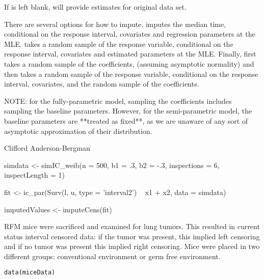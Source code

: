 \documentclass[a4paper]{book}
\begin{document}
%
\begin{Details}\relax
 	
If  is left blank, will provide estimates for original data set. 

There are several options for how to impute.  
imputes the median time, conditional on the response interval, covariates and 
regression parameters at the MLE.  takes a 
random sample of the response variable, conditional on the response interval, 
covariates and estimated parameters at the MLE. Finally, 
 first takes a random sample of the coefficients,
(assuming asymptotic normality) and then takes a random sample 
of the response variable, conditional on the response interval, 
covariates, and the random sample of the coefficients. 


NOTE: for the fully-parametric model, sampling the coefficients includes sampling 
the baseline parameters. However, for the semi-parametric model, 
the baseline parameters are **treated as fixed**, as 
we are unaware of any sort of asymptotic approximation of their distribution. 

\end{Details}
%
\begin{Author}\relax
Clifford Anderson-Bergman
\end{Author}
%
\begin{Examples}
\begin{ExampleCode}

simdata <- simIC_weib(n = 500, b1 = .3, b2 = -.3,
                      inspections = 6, inspectLength = 1)
  
fit <- ic_par(Surv(l, u, type = 'interval2') ~ x1 + x2,
                   data = simdata)

imputedValues <- imputeCens(fit)
\end{ExampleCode}
\end{Examples}
%
\begin{Description}\relax
RFM mice were sacrificed and examined for lung tumors. This resulted in current status interval censored data: if the tumor was present, this implied left censoring and if no tumor was present this implied right censoring. Mice were placed in two different groups: conventional environment or germ free environment.
\end{Description}
%
\begin{Usage}
\begin{verbatim}
data(miceData)
\end{verbatim}
\end{Usage}
\end{document}
